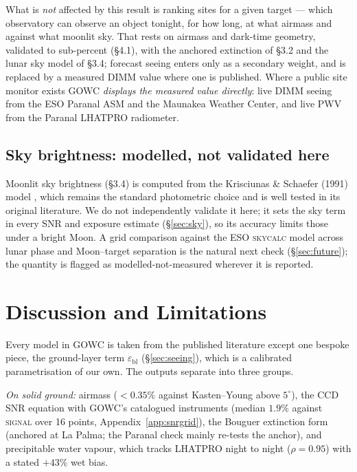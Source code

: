 \documentclass[11pt]{article}
\begin{document}
What is \emph{not} affected by this result is ranking sites for a given target ---
which observatory can observe an object tonight, for how long, at what airmass and
against what moonlit sky. That rests on airmass and dark-time geometry, validated to
sub-percent (\S4.1), with the anchored extinction of \S3.2 and the lunar sky model of
\S3.4; forecast seeing enters only as a secondary weight, and is replaced by a measured
DIMM value where one is published. Where a public site monitor exists GOWC
\emph{displays the measured value directly}: live DIMM seeing from the ESO Paranal ASM
and the Maunakea Weather Center, and live PWV from the Paranal LHATPRO radiometer.

\subsection{Sky brightness: modelled, not validated here}
\label{sec:skyval}
Moonlit sky brightness (\S3.4) is computed from the Krisciunas \& Schaefer (1991)
model \cite{ks1991}, which remains the standard photometric choice and is well tested
in its original literature. We do not independently validate it here; it sets the
sky term in every SNR and exposure estimate (\S\ref{sec:sky}), so its accuracy limits
those under a bright Moon.
A grid comparison against the ESO \textsc{skycalc} model \cite{skycalc} across lunar
phase and Moon--target separation is the natural next check (\S\ref{sec:future}); the
quantity is flagged as modelled-not-measured wherever it is reported.

\section{Discussion and Limitations}

Every model in GOWC is taken from the published literature except one bespoke piece,
the ground-layer term $\varepsilon_{\text{bl}}$ (\S\ref{sec:seeing}), which is a
calibrated parametrisation of our own. The outputs separate into three groups.

\emph{On solid ground:} airmass ($<0.35\%$ against Kasten--Young above $5^\circ$),
the CCD SNR equation with GOWC's catalogued instruments (median $1.9\%$ against
\textsc{signal} over 16 points, Appendix~\ref{app:snrgrid}), the Bouguer extinction
form (anchored at La Palma; the Paranal check mainly re-tests the anchor), and
precipitable water vapour, which tracks LHATPRO night to night ($\rho=0.95$) with a
stated $+43\%$ wet bias.
\end{document}
